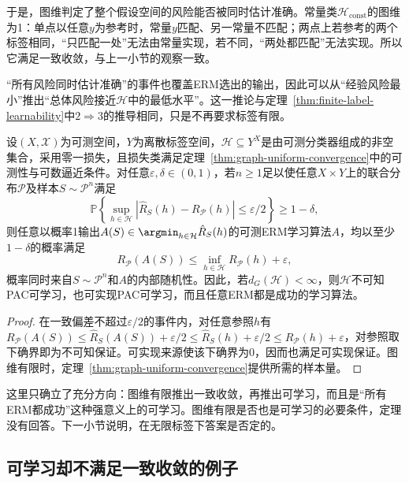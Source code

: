 于是，图维判定了整个假设空间的风险能否被同时估计准确。常量类$\mathcal H_{\mathrm{const}}$的图维为1：单点以任意$y$为参考时，常量$y$匹配、另一常量不匹配；两点上若参考的两个标签相同，“只匹配一处”无法由常量实现，若不同，“两处都匹配”无法实现。所以它满足一致收敛，与上一小节的观察一致。

“所有风险同时估计准确”的事件也覆盖ERM选出的输出，因此可以从“经验风险最小”推出“总体风险接近$\mathcal H$中的最低水平”。这一推论与定理~\ref{thm:finite-label-learnability}中$2\Rightarrow3$的推导相同，只是不再要求标签有限。

\begin{theorem}[一致收敛推出可学习性]
\label{thm:multiclass-uniform-pac}
设$(X,\mathcal X)$为可测空间，$Y$为离散标签空间，$\mathcal H\subseteq Y^X$是由可测分类器组成的非空集合，采用零一损失，且损失类满足定理~\ref{thm:graph-uniform-convergence}中的可测性与可数逼近条件。对任意$\varepsilon,\delta\in(0,1)$，若$n\geq1$足以使任意$X\times Y$上的联合分布$\mathcal P$及样本$S\sim\mathcal P^n$满足
\[
 \mathbb P\!\left\{
 \sup_{h\in\mathcal H}|\hat R_S(h)-R_{\mathcal P}(h)|\leq\varepsilon/2
 \right\}\geq1-\delta,
\]
则任意以概率1输出$A(S)\in\argmin_{h\in\mathcal H}\hat R_S(h)$的可测ERM学习算法$A$，均以至少$1-\delta$的概率满足
\[
 R_{\mathcal P}(A(S))\leq\inf_{h\in\mathcal H}R_{\mathcal P}(h)+\varepsilon,
\]
概率同时来自$S\sim\mathcal P^n$和$A$的内部随机性。因此，若$d_G(\mathcal H)<\infty$，则$\mathcal H$不可知PAC可学习，也可实现PAC可学习，而且任意ERM都是成功的学习算法。
\end{theorem}

\begin{proof}
在一致偏差不超过$\varepsilon/2$的事件内，对任意参照$h$有$R_{\mathcal P}(A(S))\leq\hat R_S(A(S))+\varepsilon/2\leq\hat R_S(h)+\varepsilon/2\leq R_{\mathcal P}(h)+\varepsilon$，对参照取下确界即为不可知保证。可实现来源使该下确界为0，因而也满足可实现保证。图维有限时，定理~\ref{thm:graph-uniform-convergence}提供所需的样本量。
\end{proof}

这里只确立了充分方向：图维有限推出一致收敛，再推出可学习，而且是“所有ERM都成功”这种强意义上的可学习。图维有限是否也是可学习的必要条件，定理没有回答。下一小节说明，在无限标签下答案是否定的。

\subsection{可学习却不满足一致收敛的例子}
\label{sec:multiclass-erm-limitations}
\label{sec:lt6-learnable-without-uc}

